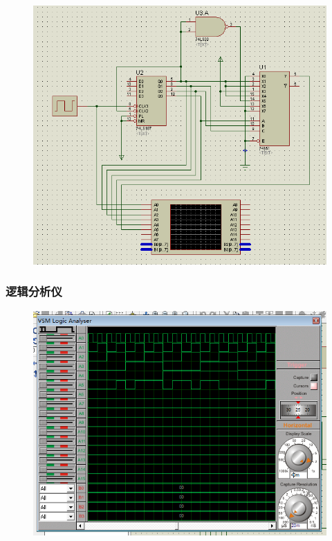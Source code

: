 \documentclass{article}
\begin{document}
\begin{figure}[!hbp]
  \centering
  \includegraphics[scale=0.5]{2/2.png}
\end{figure}

\subsubsection{逻辑分析仪}

\begin{figure}[!hbp]
  \centering
  \includegraphics[scale=0.5]{2/1.png}
\end{figure}
\end{document}
